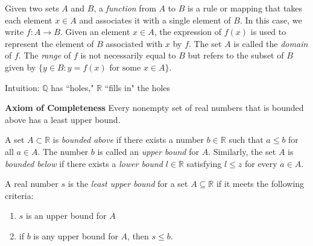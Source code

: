 \documentclass{ximera}
\begin{document}
\begin{definition}[Definition 1.2.3]
    Given two sets $A$ and $B$, a \textit{function} from $A$ to $B$ is a rule or mapping that takes each element $x \in A$ and associates it with a single element of $B$.  In this case, we write $f: A \to B$.  Given an element $x \in A$, the expression of $f(x)$ is used to represent the element of $B$ associated with $x$ by $f$.  The set $A$ is called the \textit{domain} of $f$.  The \textit{range} of $f$ is not necessarily equal to $B$ but refers to the subset of $B$ given by $\{y \in B: y = f(x) \text{ for some } x \in A\}$.
\end{definition}

Intuition:  $\mathbb{Q}$ has ``holes," $\mathbb{R}$ ``fills in" the holes

\textbf{Axiom of Completeness} Every nonempty set of real numbers that is bounded above has a least upper bound.

\begin{definition}
    A set $A \subset \mathbb{R}$ is \textit{bounded above} if there exists a number $b \in \mathbb{R}$ such that $a \leq b$ for all $a \in A$.  The number $b$ is called an \textit{upper bound} for $A$.  Similarly, the set $A$ is \textit{bounded below} if there exists a \textit{lower bound} $l \in \mathbb{R}$ satisfying $l \leq z$ for every $a \in A$.
\end{definition}

\begin{definition}
    A real number $s$ is the \textit{least upper bound} for a set $A \subseteq \mathbb{R}$ if it meets the following criteria:
    \begin{enumerate}
        \item $s$ is an upper bound for $A$
        \item if $b$ is any upper bound for $A$, then $s \leq b$.
    \end{enumerate}
\end{definition}
\end{document}
